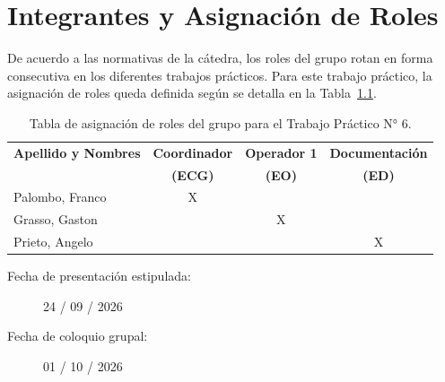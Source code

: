 \chapter{Integrantes y Asignación de Roles}
De acuerdo a las normativas de la cátedra, los roles del grupo rotan en forma consecutiva en los diferentes trabajos
prácticos. Para este trabajo práctico, la asignación de roles queda definida según se detalla en la
Tabla~\ref{tab.roles:tp6}.

\begin{table}[!ht]
    \centering
    \begin{tabular}{|l|c|c|c|}
        \hline
        \textbf{Apellido y Nombres} & \textbf{Coordinador} & \textbf{Operador 1} & \textbf{Documentación} \\
                                    & \textbf{(ECG)}       & \textbf{(EO)}       & \textbf{(ED)} \\ \hline
        Palombo, Franco & X & & \\ \hline
        Grasso, Gaston  & & X & \\ \hline
        Prieto, Angelo  & & & X \\ \hline
    \end{tabular}
    \caption{Tabla de asignación de roles del grupo para el Trabajo Práctico N° 6.}
    \label{tab.roles:tp6}
\end{table}

\begin{description}
    \item[Fecha de presentación estipulada:] 24 / 09 / 2026
    \item[Fecha de coloquio grupal:] 01 / 10 / 2026
\end{description}
